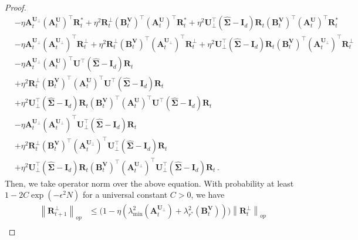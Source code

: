 \begin{proof}
\begin{align*}
        & -\eta \bm A^{\bm U_\perp}_t\left(\bm A^{\bm U}_t\right)^{\!\top}\bm R^*_t
        + \eta^2 \bm R^\perp_t \left(\bm B_t^{\bm V}\right)^{\!\top}\left(\bm A^{\bm U}_t\right)^{\!\top}\bm R^*_t
        + \eta^2 \bm U_\perp^{\!\top}\left(\widehat{\bm \Sigma}
        - \bm I_d\right) \bm R_t \left(\bm B_t^{\bm V}\right)^{\!\top}\left(\bm A^{\bm U}_t\right)^{\!\top}\bm R^*_t\\
        & - \eta \bm A^{\bm U_\perp}_t \left(\bm A^{\bm U_\perp}_t\right)^{\!\top}\bm R^\perp_t
        + \eta^2 \bm R^\perp_t \left(\bm B_t^{\bm V}\right)^{\!\top}\left(\bm A^{\bm U_\perp}_t\right)^{\!\top}\bm R^\perp_t
        + \eta^2 \bm U_\perp^{\!\top}\left(\widehat{\bm \Sigma}
        - \bm I_d\right) \bm R_t \left(\bm B_t^{\bm V}\right)^{\!\top}\left(\bm A^{\bm U_\perp}_t\right)^{\!\top}\bm R^\perp_t\\
        & - \eta \bm A^{\bm U_\perp}_t \left(\bm A_t^{\bm U}\right)^{\!\top}\bm U^{\!\top}\left(\widehat{\bm \Sigma}-\bm I_d\right)\bm R_t\\
        & + \eta^2 \bm R^\perp_t \left(\bm B_t^{\bm V}\right)^{\!\top}\left(\bm A_t^{\bm U}\right)^{\!\top}\bm U^{\!\top}\left(\widehat{\bm \Sigma}-\bm I_d\right)\bm R_t\\
        & + \eta^2 \bm U_\perp^{\!\top}\left(\widehat{\bm \Sigma}
        - \bm I_d\right) \bm R_t \left(\bm B_t^{\bm V}\right)^{\!\top}\left(\bm A_t^{\bm U}\right)^{\!\top}\bm U^{\!\top}\left(\widehat{\bm \Sigma}-\bm I_d\right)\bm R_t\\
        & - \eta \bm A^{\bm U_\perp}_t \left(\bm A_t^{\bm U_\perp}\right)^{\!\top}\bm U_\perp^{\!\top}\left(\widehat{\bm \Sigma}-\bm I_d\right)\bm R_t \\
        & + \eta^2 \bm R^\perp_t \left(\bm B_t^{\bm V}\right)^{\!\top}\left(\bm A_t^{\bm U_\perp}\right)^{\!\top}\bm U_\perp^{\!\top}\left(\widehat{\bm \Sigma}-\bm I_d\right)\bm R_t\\
        & + \eta^2 \bm U_\perp^{\!\top}\left(\widehat{\bm \Sigma}
        - \bm I_d\right) \bm R_t \left(\bm B_t^{\bm V}\right)^{\!\top}\left(\bm A_t^{\bm U_\perp}\right)^{\!\top}\bm U_\perp^{\!\top}\left(\widehat{\bm \Sigma}-\bm I_d\right)\bm R_t\,.
    \end{align*}
    Then, we take operator norm over the above equation. With probability at least $1- 2C\exp(-\epsilon^2 N)$ for a universal constant $C>0$, we have
    \begin{align*}
        \left\|\bm R^\perp_{t+1}\right\|_{op} & \leq \bigg(1-\eta\left(\lambda_{\min}^2\left(\bm A_t^{\bm U_\perp}\right)+\lambda_{r^*}^2\left(\bm B_t^{\bm V}\right)\right)\bigg)\left\|\bm R^\perp_{t}\right\|_{op}\\

\end{align*}
\end{proof}
